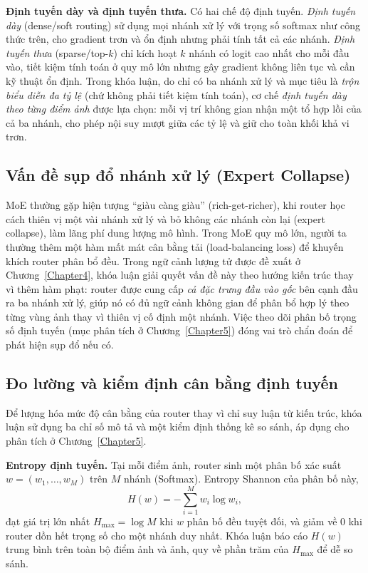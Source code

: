 \noindent\textbf{Định tuyến dày và định tuyến thưa.} Có hai chế độ định tuyến. \emph{Định tuyến dày} (dense/soft routing) sử dụng mọi nhánh xử lý với trọng số softmax như công thức trên, cho gradient trơn và ổn định nhưng phải tính tất cả các nhánh. \emph{Định tuyến thưa} (sparse/top-$k$) chỉ kích hoạt $k$ nhánh có logit cao nhất cho mỗi đầu vào, tiết kiệm tính toán ở quy mô lớn nhưng gây gradient không liên tục và cần kỹ thuật ổn định. Trong khóa luận, do chỉ có ba nhánh xử lý và mục tiêu là \emph{trộn biểu diễn đa tỷ lệ} (chứ không phải tiết kiệm tính toán), cơ chế \emph{định tuyến dày theo từng điểm ảnh} được lựa chọn: mỗi vị trí không gian nhận một tổ hợp lồi của cả ba nhánh, cho phép nội suy mượt giữa các tỷ lệ và giữ cho toàn khối khả vi trơn.

\subsection{Vấn đề sụp đổ nhánh xử lý (Expert Collapse)}
MoE thường gặp hiện tượng ``giàu càng giàu'' (rich-get-richer), khi router học cách thiên vị một vài nhánh xử lý và bỏ không các nhánh còn lại (expert collapse), làm lãng phí dung lượng mô hình. Trong MoE quy mô lớn, người ta thường thêm một hàm mất mát cân bằng tải (load-balancing loss) để khuyến khích router phân bổ đều. Trong ngữ cảnh lượng tử được đề xuất ở Chương~\ref{Chapter4}, khóa luận giải quyết vấn đề này theo hướng kiến trúc thay vì thêm hàm phạt: router được cung cấp \emph{cả đặc trưng đầu vào gốc} bên cạnh đầu ra ba nhánh xử lý, giúp nó có đủ ngữ cảnh không gian để phân bổ hợp lý theo từng vùng ảnh thay vì thiên vị cố định một nhánh. Việc theo dõi phân bố trọng số định tuyến (mục phân tích ở Chương~\ref{Chapter5}) đóng vai trò chẩn đoán để phát hiện sụp đổ nếu có.

\subsection{Đo lường và kiểm định cân bằng định tuyến}
\label{subsec:router_balance_stats}
Để lượng hóa mức độ cân bằng của router thay vì chỉ suy luận từ kiến trúc, khóa luận sử dụng ba chỉ số mô tả và một kiểm định thống kê so sánh, áp dụng cho phân tích ở Chương~\ref{Chapter5}.

\noindent\textbf{Entropy định tuyến.} Tại mỗi điểm ảnh, router sinh một phân bố xác suất $w=(w_1,\dots,w_M)$ trên $M$ nhánh (Softmax). Entropy Shannon của phân bố này,
\begin{equation}
    H(w) = -\sum_{i=1}^{M} w_i \log w_i,
\end{equation}
đạt giá trị lớn nhất $H_{\max}=\log M$ khi $w$ phân bố đều tuyệt đối, và giảm về $0$ khi router dồn hết trọng số cho một nhánh duy nhất. Khóa luận báo cáo $H(w)$ trung bình trên toàn bộ điểm ảnh và ảnh, quy về phần trăm của $H_{\max}$ để dễ so sánh.

